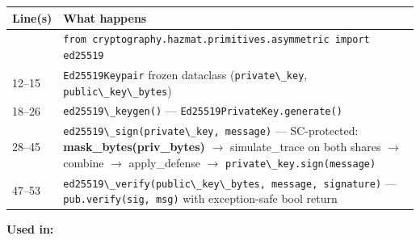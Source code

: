 \documentclass[11pt,a4paper]{article}
\newcommand{\code}[1]{\lstinline[basicstyle=\ttfamily\small]!#1!}
\begin{document}
\begin{longtable}{L{2.2cm} L{11.5cm}}
\toprule
\textbf{Line(s)} & \textbf{What happens} \\
\midrule
\endhead
\bottomrule
{}       & \code{from cryptography.hazmat.primitives.asymmetric import ed25519} \\
12--15  & \code{Ed25519Keypair} frozen dataclass (\code{private\_key}, \code{public\_key\_bytes}) \\
18--26  & \code{ed25519\_keygen()} --- \code{Ed25519PrivateKey.generate()} \\
28--45  & \code{ed25519\_sign(private\_key, message)} --- SC-protected: \textbf{mask\_bytes(priv\_bytes)} $\to$ simulate\_trace on both shares $\to$ combine $\to$ apply\_defense $\to$ \code{private\_key.sign(message)} \\
47--53  & \code{ed25519\_verify(public\_key\_bytes, message, signature)} --- \code{pub.verify(sig, msg)} with exception-safe bool return \\
\end{longtable}

\textbf{Used in:}
\end{document}
